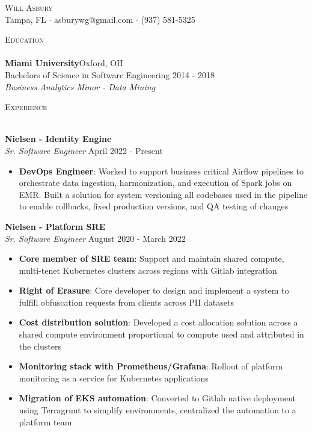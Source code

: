 \documentclass[a4paper]{article}
\newcommand{\lineunder} {
    \vspace*{-8pt} \\
    \hspace*{-18pt} \hrulefill \\
}
\newcommand{\header} [1] {
    {\hspace*{-18pt}\vspace*{6pt} \textsc{#1}}
    \vspace*{-6pt} \lineunder
}
\begin{document}
\vspace*{-40pt}

    

\vspace*{-10pt}
\begin{center}
	{\Huge \scshape {Will Asbury}}\\
	Tampa, FL $\cdot$ asburywg@gmail.com $\cdot$ (937) 581-5325\\
\end{center}

\header{Education}
\textbf{Miami University}\hfill Oxford, OH\\
Bachelors of Science in Software Engineering \hfill 2014 - 2018\\
\textit{Business Analytics Minor - Data Mining}\\
\vspace{3mm}

\header{Experience}
\vspace{1mm}

\textbf{Nielsen - Identity Engine}\\
\textit{Sr. Software Engineer} \hfill April 2022 - Present\\
\vspace{-1mm}
\begin{itemize} \itemsep 1pt
    \item \textbf{DevOps Engineer}: Worked to support business critical Airflow pipelines to orchestrate data ingestion, harmonization, and execution of Spark jobs on EMR. Built a solution for system versioning all codebases used in the pipeline to enable rollbacks, fixed production versions, and QA testing of changes
\end{itemize}

\textbf{Nielsen - Platform SRE}\\
\textit{Sr. Software Engineer} \hfill August 2020 - March 2022\\
\vspace{-1mm}
\begin{itemize} \itemsep 1pt
    \item \textbf{Core member of SRE team}: Support and maintain shared compute, multi-tenet Kubernetes clusters across regions with Gitlab integration
    \item \textbf{Right of Erasure}: Core developer to design and implement a system to fulfill obfuscation requests from clients across PII datasets
    \item \textbf{Cost distribution solution}: Developed a cost allocation solution across a shared compute environment proportional to compute used and attributed in the clusters
    \item \textbf{Monitoring stack with Prometheus/Grafana}: Rollout of platform monitoring as a service for Kubernetes applications
    \item \textbf{Migration of EKS automation}: Converted to Gitlab native deployment using Terragrunt to simplify environments, centralized the automation to a platform team
\end{itemize}
\end{document}
